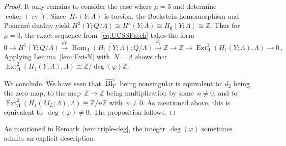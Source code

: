 \documentclass[10.9pt,a4paper]{amsart}
\theoremstyle{definition}
\theoremstyle{remark}
\newcommand{\Z}{\mathbb{Z}}
\newcommand{\Bl}{\operatorname{Bl}}
\newcommand{\ev}{\operatorname{ev}}
\newcommand{\coker}{\operatorname{coker}}
\newcommand{\Ext}{\operatorname{Ext}}
\newcommand{\Hom}{\operatorname{Hom}}
\begin{document}
\begin{proof}
It only remains to consider the case where $\mu=3$ and determine $\coker(\ev)$.
Since~$H_*(Y;\Lambda)$ is torsion,  the Bockstein
homomorphism and Poincar\'e duality yield
$
H^2(Y;Q/\Lambda)\cong H^3(Y;\Lambda)\cong H_0(Y;\Lambda)\cong\Z.
$
Thus for $\mu=3$, the exact sequence from~\eqref{eq:UCSSPatch} takes the form
\[
0\to H^1(Y;Q/\Lambda) \stackrel{\ev}{\longrightarrow} \overline{\Hom_\Lambda(H_1(Y;\Lambda);Q/\Lambda)} \stackrel{d_2}{\longrightarrow} \Z \to \Z \to \Ext_\Lambda^2(H_1(Y;\Lambda),\Lambda) \to 0\,,
\]
Applying Lemma~\ref{lem:Ext-N} with~$N=\Lambda$ shows that~$\Ext^2_\Lambda(H_1(Y;\Lambda),\Lambda)\cong \Z/\deg(\varphi) \Z$.

We conclude.
We have seen that $\hat{\Bl}_Y^\varphi$ 
\color{black}
being nonsingular is equivalent to~$d_2$ being the zero map,  to the map~$\Z\to\Z$ being multiplication by some~$n\neq 0$, and to~$\Ext_\Lambda^2(H_1(M_L;\Lambda),\Lambda)\cong\Z/n\Z$ with~$n\neq 0$.
As mentioned above,  this is equivalent to~$\deg(\varphi)\neq 0$.
The proposition follows.
\end{proof}




As mentioned in Remark~\ref{rem:triple-deg}, the integer~$\deg(\varphi)$ sometimes admits an explicit description.
\end{document}
